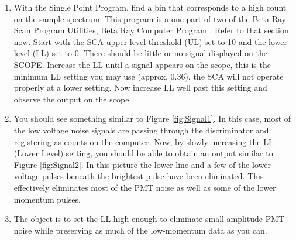 \documentclass{../lab}
\begin{document}
\begin{enumerate}
    \item With the Single Point Program, find a bin that corresponds to a high count on the sample spectrum. This program is a one part of two of the Beta Ray Scan Program Utilities, Beta Ray Computer Program \cite{Krane}. Refer to that section now. Start with the SCA upper-level threshold (UL) set to 10 and the lower-level (LL) set to 0. There should be little or no signal displayed on the SCOPE. Increase the LL until a signal appears on the scope, this is the minimum LL setting you may use (approx. 0.36), the SCA will not operate properly at a lower setting. Now increase LL well past this setting and observe the output on the scope

    \item You should see something similar to Figure \ref{fig:Signal1}. In this case, most of the low voltage noise signals are passing through the discriminator and registering as counts on the computer. Now, by slowly increasing the LL (Lower Level) setting, you should be able to obtain an output similar to Figure \ref{fig:Signal2}. In this picture the lower line and a few of the lower voltage pulses beneath the brightest pulse have been eliminated. This effectively eliminates most of the PMT noise as well as some of the lower momentum pulses.
    

    \item The object is to set the LL high enough to eliminate small-amplitude PMT noise while preserving as much of the low-momentum data as you can.


\end{enumerate}
\end{document}

